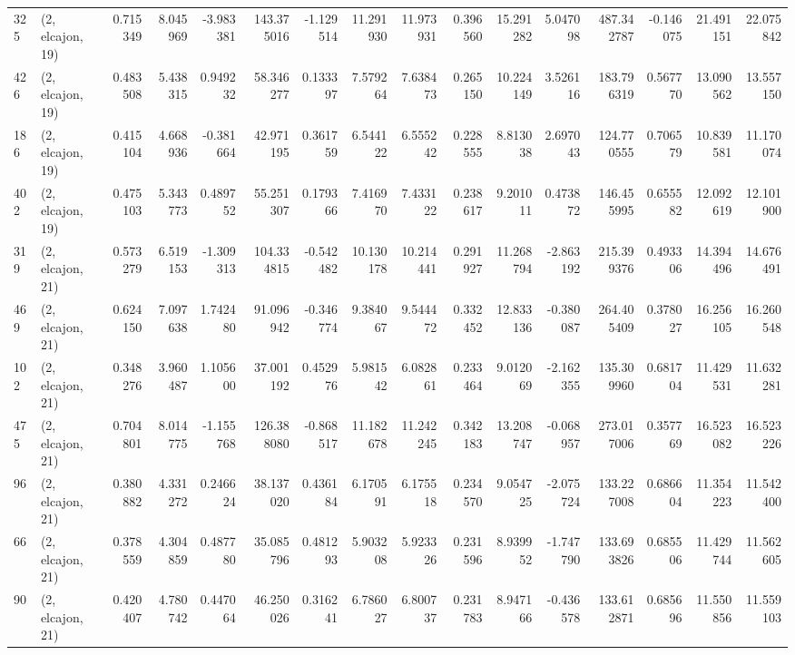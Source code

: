 \begin{tabular}{llrrrrrrrrrrrrrr}
325 &  (2, elcajon, 19) &   0.715349 &   8.045969 &  -3.983381 &   143.375016 &  -1.129514 &  11.291930 &  11.973931 &  0.396560 &  15.291282 &   5.047098 &   487.342787 & -0.146075 &  21.491151 &  22.075842 \\
426 &  (2, elcajon, 19) &   0.483508 &   5.438315 &   0.949232 &    58.346277 &   0.133397 &   7.579264 &   7.638473 &  0.265150 &  10.224149 &   3.526116 &   183.796319 &  0.567770 &  13.090562 &  13.557150 \\
186 &  (2, elcajon, 19) &   0.415104 &   4.668936 &  -0.381664 &    42.971195 &   0.361759 &   6.544122 &   6.555242 &  0.228555 &   8.813038 &   2.697043 &   124.770555 &  0.706579 &  10.839581 &  11.170074 \\
402 &  (2, elcajon, 19) &   0.475103 &   5.343773 &   0.489752 &    55.251307 &   0.179366 &   7.416970 &   7.433122 &  0.238617 &   9.201011 &   0.473872 &   146.455995 &  0.655582 &  12.092619 &  12.101900 \\
319 &  (2, elcajon, 21) &   0.573279 &   6.519153 &  -1.309313 &   104.334815 &  -0.542482 &  10.130178 &  10.214441 &  0.291927 &  11.268794 &  -2.863192 &   215.399376 &  0.493306 &  14.394496 &  14.676491 \\
469 &  (2, elcajon, 21) &   0.624150 &   7.097638 &   1.742480 &    91.096942 &  -0.346774 &   9.384067 &   9.544472 &  0.332452 &  12.833136 &  -0.380087 &   264.405409 &  0.378027 &  16.256105 &  16.260548 \\
102 &  (2, elcajon, 21) &   0.348276 &   3.960487 &   1.105600 &    37.001192 &   0.452976 &   5.981542 &   6.082861 &  0.233464 &   9.012069 &  -2.162355 &   135.309960 &  0.681704 &  11.429531 &  11.632281 \\
475 &  (2, elcajon, 21) &   0.704801 &   8.014775 &  -1.155768 &   126.388080 &  -0.868517 &  11.182678 &  11.242245 &  0.342183 &  13.208747 &  -0.068957 &   273.017006 &  0.357769 &  16.523082 &  16.523226 \\
96  &  (2, elcajon, 21) &   0.380882 &   4.331272 &   0.246624 &    38.137020 &   0.436184 &   6.170591 &   6.175518 &  0.234570 &   9.054725 &  -2.075724 &   133.227008 &  0.686604 &  11.354223 &  11.542400 \\
66  &  (2, elcajon, 21) &   0.378559 &   4.304859 &   0.487780 &    35.085796 &   0.481293 &   5.903208 &   5.923326 &  0.231596 &   8.939952 &  -1.747790 &   133.693826 &  0.685506 &  11.429744 &  11.562605 \\
90  &  (2, elcajon, 21) &   0.420407 &   4.780742 &   0.447064 &    46.250026 &   0.316241 &   6.786027 &   6.800737 &  0.231783 &   8.947166 &  -0.436578 &   133.612871 &  0.685696 &  11.550856 &  11.559103 \\

\end{tabular}
